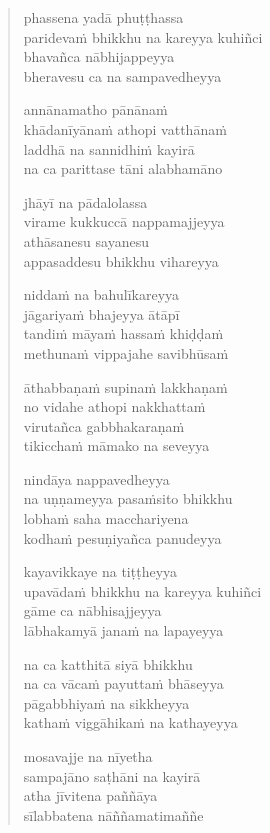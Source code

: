 \begin{verse}
phassena yadā phuṭṭhassa\\
paridevaṁ bhikkhu na kareyya kuhiñci\\
bhavañca nābhijappeyya\\
bheravesu ca na sampavedheyya

annānamatho pānānaṁ\\
khādanīyānaṁ athopi vatthānaṁ\\
laddhā na sannidhiṁ kayirā\\
na ca parittase tāni alabhamāno

jhāyī na pādalolassa\\
virame kukkuccā nappamajjeyya\\
athāsanesu sayanesu\\
appasaddesu bhikkhu vihareyya

niddaṁ na bahulīkareyya\\
jāgariyaṁ bhajeyya ātāpī\\
tandiṁ māyaṁ hassaṁ khiḍḍaṁ\\
methunaṁ vippajahe savibhūsaṁ

āthabbaṇaṁ supinaṁ lakkhaṇaṁ\\
no vidahe athopi nakkhattaṁ\\
virutañca gabbhakaraṇaṁ\\
tikicchaṁ māmako na seveyya

nindāya nappavedheyya\\
na uṇṇameyya pasaṁsito bhikkhu\\
lobhaṁ saha macchariyena\\
kodhaṁ pesuṇiyañca panudeyya

kayavikkaye na tiṭṭheyya\\
upavādaṁ bhikkhu na kareyya kuhiñci\\
gāme ca nābhisajjeyya\\
lābhakamyā janaṁ na lapayeyya

na ca katthitā siyā bhikkhu\\
na ca vācaṁ payuttaṁ bhāseyya\\
pāgabbhiyaṁ na sikkheyya\\
kathaṁ viggāhikaṁ na kathayeyya

mosavajje na nīyetha\\
sampajāno saṭhāni na kayirā\\
atha jīvitena paññāya\\
sīlabbatena nāññamatimaññe


\end{verse}
